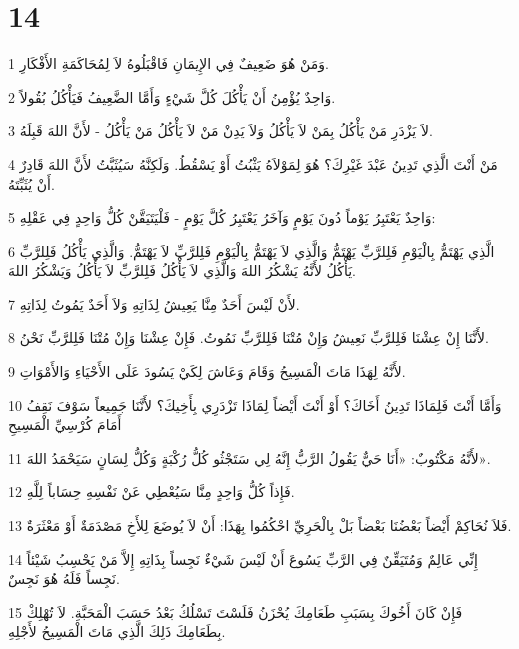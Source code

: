 \chapter{14}

\par 1 وَمَنْ هُوَ ضَعِيفٌ فِي الإِيمَانِ فَاقْبَلُوهُ لاَ لِمُحَاكَمَةِ الأَفْكَارِ.
\par 2 وَاحِدٌ يُؤْمِنُ أَنْ يَأْكُلَ كُلَّ شَيْءٍ وَأَمَّا الضَّعِيفُ فَيَأْكُلُ بُقُولاً.
\par 3 لاَ يَزْدَرِ مَنْ يَأْكُلُ بِمَنْ لاَ يَأْكُلُ وَلاَ يَدِنْ مَنْ لاَ يَأْكُلُ مَنْ يَأْكُلُ - لأَنَّ اللهَ قَبِلَهُ.
\par 4 مَنْ أَنْتَ الَّذِي تَدِينُ عَبْدَ غَيْرِكَ؟ هُوَ لِمَوْلاَهُ يَثْبُتُ أَوْ يَسْقُطُ. وَلَكِنَّهُ سَيُثَبَّتُ لأَنَّ اللهَ قَادِرٌ أَنْ يُثَبِّتَهُ.
\par 5 وَاحِدٌ يَعْتَبِرُ يَوْماً دُونَ يَوْمٍ وَآخَرُ يَعْتَبِرُ كُلَّ يَوْمٍ - فَلْيَتَيَقَّنْ كُلُّ وَاحِدٍ فِي عَقْلِهِ:
\par 6 الَّذِي يَهْتَمُّ بِالْيَوْمِ فَلِلرَّبِّ يَهْتَمُّ وَالَّذِي لاَ يَهْتَمُّ بِالْيَوْمِ فَلِلرَّبِّ لاَ يَهْتَمُّ. وَالَّذِي يَأْكُلُ فَلِلرَّبِّ يَأْكُلُ لأَنَّهُ يَشْكُرُ اللهَ وَالَّذِي لاَ يَأْكُلُ فَلِلرَّبِّ لاَ يَأْكُلُ وَيَشْكُرُ اللهَ.
\par 7 لأَنْ لَيْسَ أَحَدٌ مِنَّا يَعِيشُ لِذَاتِهِ وَلاَ أَحَدٌ يَمُوتُ لِذَاتِهِ.
\par 8 لأَنَّنَا إِنْ عِشْنَا فَلِلرَّبِّ نَعِيشُ وَإِنْ مُتْنَا فَلِلرَّبِّ نَمُوتُ. فَإِنْ عِشْنَا وَإِنْ مُتْنَا فَلِلرَّبِّ نَحْنُ.
\par 9 لأَنَّهُ لِهَذَا مَاتَ الْمَسِيحُ وَقَامَ وَعَاشَ لِكَيْ يَسُودَ عَلَى الأَحْيَاءِ وَالأَمْوَاتِ.
\par 10 وَأَمَّا أَنْتَ فَلِمَاذَا تَدِينُ أَخَاكَ؟ أَوْ أَنْتَ أَيْضاً لِمَاذَا تَزْدَرِي بِأَخِيكَ؟ لأَنَّنَا جَمِيعاً سَوْفَ نَقِفُ أَمَامَ كُرْسِيِّ الْمَسِيحِ
\par 11 لأَنَّهُ مَكْتُوبٌ: «أَنَا حَيٌّ يَقُولُ الرَّبُّ إِنَّهُ لِي سَتَجْثُو كُلُّ رُكْبَةٍ وَكُلُّ لِسَانٍ سَيَحْمَدُ اللهَ».
\par 12 فَإِذاً كُلُّ وَاحِدٍ مِنَّا سَيُعْطِي عَنْ نَفْسِهِ حِسَاباً لِلَّهِ.
\par 13 فَلاَ نُحَاكِمْ أَيْضاً بَعْضُنَا بَعْضاً بَلْ بِالْحَرِيِّ احْكُمُوا بِهَذَا: أَنْ لاَ يُوضَعَ لِلأَخِ مَصْدَمَةٌ أَوْ مَعْثَرَةٌ.
\par 14 إِنِّي عَالِمٌ وَمُتَيَقِّنٌ فِي الرَّبِّ يَسُوعَ أَنْ لَيْسَ شَيْءٌ نَجِساً بِذَاتِهِ إِلاَّ مَنْ يَحْسِبُ شَيْئاً نَجِساً فَلَهُ هُوَ نَجِسٌ.
\par 15 فَإِنْ كَانَ أَخُوكَ بِسَبَبِ طَعَامِكَ يُحْزَنُ فَلَسْتَ تَسْلُكُ بَعْدُ حَسَبَ الْمَحَبَّةِ. لاَ تُهْلِكْ بِطَعَامِكَ ذَلِكَ الَّذِي مَاتَ الْمَسِيحُ لأَجْلِهِ.
